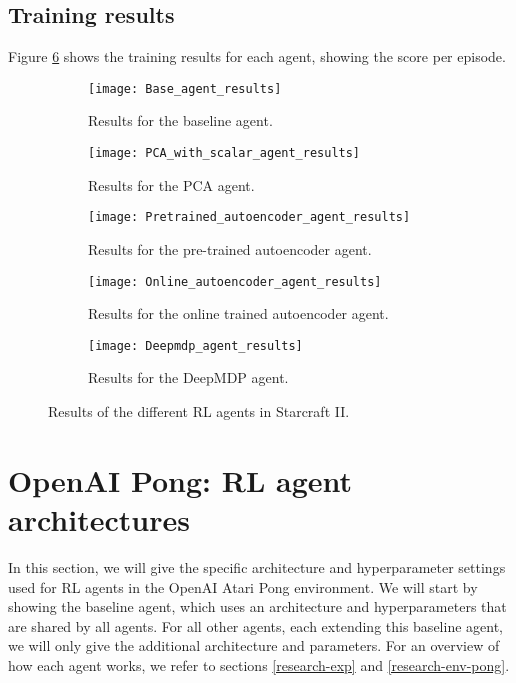 \subsection{Training results}
Figure \ref{fig:results-agents} shows the training results for each agent, showing the score per episode.

\begin{figure}[h!]
	\centering
	\begin{subfigure}[b]{0.45\textwidth}
		\texttt{[image: Base\_agent\_results]}
		\caption{Results for the baseline agent.}
		\label{fig:results-base} 
	\end{subfigure}\hfill
	\begin{subfigure}[b]{0.45\textwidth}
		\texttt{[image: PCA\_with\_scalar\_agent\_results]}
		\caption{Results for the PCA agent.}
		\label{fig:results-pca}
	\end{subfigure}
	
	\medskip
	\begin{subfigure}[b]{0.45\textwidth}
		\texttt{[image: Pretrained\_autoencoder\_agent\_results]}
		\caption{Results for the pre-trained autoencoder agent.}
		\label{fig:results-ae}
	\end{subfigure} \hfill
	\begin{subfigure}[b]{0.45\textwidth}
		\texttt{[image: Online\_autoencoder\_agent\_results]}
		\caption{Results for the online trained autoencoder agent.}
		\label{fig:results-online-ae}
	\end{subfigure}
	
	\medskip
	\begin{subfigure}[b]{0.45\textwidth}
		\texttt{[image: Deepmdp\_agent\_results]}
		\caption{Results for the DeepMDP agent.}
		\label{fig:results-deepmdp}
	\end{subfigure}
	\caption{Results of the different RL agents in Starcraft II.}
	\label{fig:results-agents}
\end{figure}

\section{OpenAI Pong: RL agent architectures}\label{appendix-agents-pong}
In this section, we will give the specific architecture and hyperparameter settings used for RL agents in the OpenAI Atari Pong environment. We will start by showing the baseline agent, which uses an architecture and hyperparameters that are shared by all agents. For all other agents, each extending this baseline agent, we will only give the additional architecture and parameters. For an overview of how each agent works, we refer to sections \ref{research-exp} and \ref{research-env-pong}.


